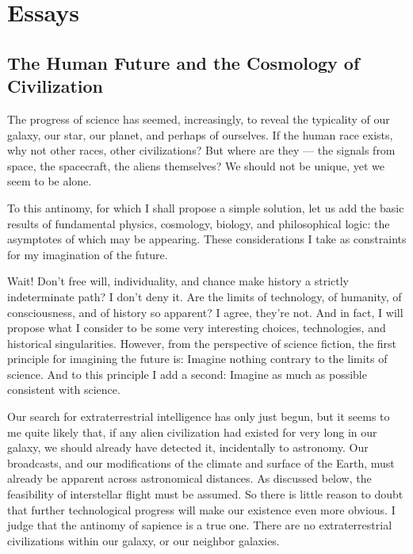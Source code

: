 \documentclass[english,11pt,letterpaper,onecolumn]{scrbook}
\begin{document}
\part{Essays}

\chapter{The Human Future and the Cosmology of Civilization}

The progress of science has seemed, increasingly, to reveal the typicality of our galaxy, our star, our planet, and perhaps of ourselves.  If the human race exists, why not other races, other civilizations?  But where are they --- the signals from space, the spacecraft, the aliens themselves?  We should not be unique, yet we seem to be alone.

To this antinomy, for which I shall propose a simple solution, let us add the basic results of fundamental physics, cosmology, biology, and philosophical logic: the asymptotes of which may be appearing.  These considerations I take as constraints for my imagination of the future.  

Wait!  Don't free will, individuality, and chance make history a strictly indeterminate path?  I don't deny it.  Are the limits of technology, of humanity, of consciousness, and of history so apparent?  I agree, they're not.  And in fact, I will propose what I consider to be some very interesting choices, technologies, and historical singularities.  However, from the perspective of science fiction, the first principle for imagining the future is:   Imagine nothing contrary to the limits of science.  And to this principle I add a second:  Imagine as much as possible consistent with science.


Our search for extraterrestrial intelligence has only just begun, but it seems to me quite likely that, if any alien civilization had existed for very long in our galaxy, we should already have detected it, incidentally to astronomy.  Our broadcasts, and our modifications of the climate and surface of the Earth, must already be apparent across astronomical distances.  As discussed below, the feasibility of interstellar flight must be assumed.  So there is little reason to doubt that further technological progress will make our existence even more obvious.  I judge that the antinomy of sapience is a true one.  There are no extraterrestrial civilizations within our galaxy, or our neighbor galaxies.  
\end{document}
